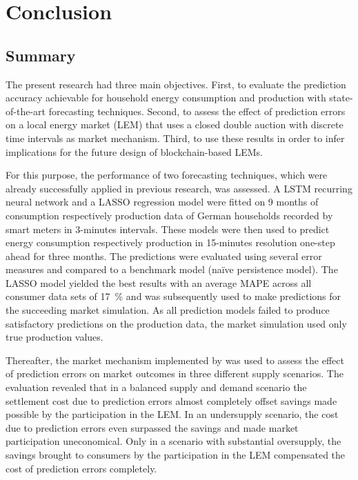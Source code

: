 
\section{Conclusion}\label{Sec:Conc}




\subsection{Summary}\label{Sec:Conclusion;Subsec:Summary}

The present research had three main objectives. First, to evaluate the prediction accuracy achievable for household energy consumption and production with state-of-the-art forecasting techniques. Second, to assess the effect of prediction errors on a local energy market (LEM) that uses a closed double auction with discrete time intervals as market mechanism. Third, to use these results in order to infer implications for the future design of blockchain-based LEMs.

For this purpose, the performance of two forecasting techniques, which were already successfully applied in previous research, was assessed. A LSTM recurring neural network and a LASSO regression model were fitted on 9 months of consumption respectively production data of German households recorded by smart meters in 3-minutes intervals. These models were then used to predict energy consumption respectively production in 15-minutes resolution one-step ahead for three months. The predictions were evaluated using several error measures and compared to a benchmark model (na\"ive persistence model). The LASSO model yielded the best results with an average MAPE across all consumer data sets of 17~\% and was subsequently used to make predictions for the succeeding market simulation. As all prediction models failed to produce satisfactory predictions on the production data, the market simulation used only true production values.

Thereafter, the market mechanism implemented by \citet{Mengelkamp:2018a} was used to assess the effect of prediction errors on market outcomes in three different supply scenarios. The evaluation revealed that in a balanced supply and demand scenario the settlement cost due to prediction errors almost completely offset savings made possible by the participation in the LEM. In an undersupply scenario, the cost due to prediction errors even surpassed the savings and made market participation uneconomical. Only in a scenario with substantial oversupply, the savings brought to consumers by the participation in the LEM compensated the cost of prediction errors completely.

